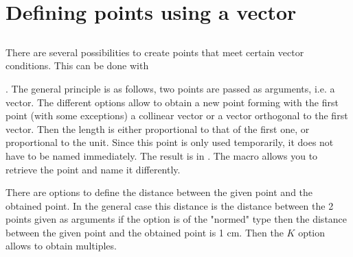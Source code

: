 \section{Defining points using a vector}

\subsection{}
There are several possibilities to create points that meet certain vector conditions.
This can be done with 

. The general principle is as follows, two points are passed as arguments, i.e. a vector. The different options allow to obtain a new point forming with the first point (with some exceptions) a collinear vector or a vector orthogonal to the first vector. Then the length is either proportional to that of the first one, or proportional to the unit. Since this point is only used temporarily, it does not have to be named immediately. The result is in . The macro  allows you to retrieve the point and name it differently.

 There are options to define the distance between the given point and the obtained point.
In the general case this distance is the distance between the 2 points given as arguments if the option is of the "normed" type then the distance between the given point and the obtained point is 1 cm. Then the $K$ option allows to obtain multiples.

